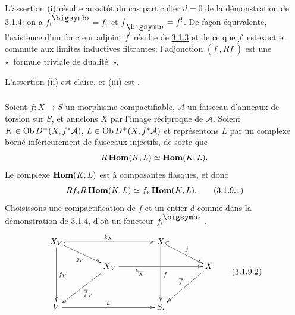 \documentclass[10pt]{../fichiers-configuration-latex/smfart}
\begin{document}
L'assertion (i) résulte aussitôt du cas particulier $d=0$ de la
démonstration de \hyperref[XVIII.thm3.1.4]{3.1.4}: on a $f^{\bigdot}_{!}=f_{!}$ et
$f^{!}_{\bigdot}=f^{!}$. De façon équivalente, l'existence d'un
foncteur adjoint $f^{!}$ résulte de \hyperref[XVIII.lem3.1.3]{3.1.3} et de ce que $f_{!}$
est\pageoriginale exact et commute aux limites inductives filtrantes;
l'adjonction $(f_{!},Rf^{!})$ est une « formule triviale de
dualité ».

L'assertion (ii) est claire, et (iii) est .

\setcounter{subsubsection}{8}
\subsubsection{}
Soient $f:X\rightarrow S$ un morphisme compactifiable, $\mathcal{A}$
un faisceau d'anneaux de torsion sur $S$, et annelons $X$ par l'image
réciproque de $\mathcal{A}$. Soient $K\in \operatorname{Ob}
D^{-}(X,f^{\ast}\mathcal{A})$, $L\in \operatorname{Ob} D^{+}(X,f^{\ast}\mathcal{A})$
et représentons $L$ par un complexe borné inférieurement de faisceaux
injectifs, de sorte que
$$
R\operatorname{\mathbf{Hom}}(K,L)\simeq \operatorname{\mathbf{Hom}}(K,L){}.
$$
Le complexe $\operatorname{\mathbf{Hom}}(K,L)$ est à composantes flasques, et donc
\begin{equation*}
Rf_{\ast}R\operatorname{\mathbf{Hom}}(K,L)\simeq f_{\ast}\operatorname{\mathbf{Hom}}(K,L){}.\tag{3.1.9.1}
\end{equation*}%
Choisissons une compactification de $f$ et un entier $d$ comme dans la
démonstration de \hyperref[XVIII.thm3.1.4]{3.1.4}, d'où un foncteur
$f^{\bigdot}_{!}$ . 
\begin{equation*}
\vcenter{
\xymatrix@C=1.5cm@R=.5cm{
X_V \ar[rr]^{k_X} \ar@{^{(}->}[rd]_{j_V} \ar[ddd]^{f_V}&      & X\ar[ddd]^{f} \ar@{^{(}->}[rd]^{j}         \\
    & \bar{X}_V \ar[ldd]^{\bar{f}_V} \ar[rr]_(.3){k_{\bar{X}}}   &   & \bar{X} \ar[ldd]_{\bar{f}}\\
    &         &        &\\
V  \ar[rr]^{k} &      & S.
}}\tag{3.1.9.2}
\end{equation*}
\end{document}
